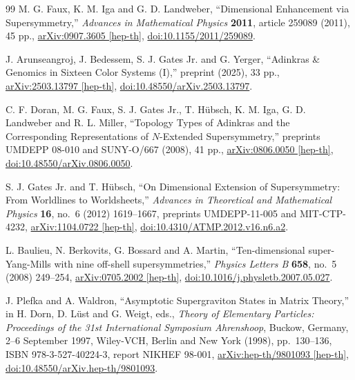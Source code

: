 \documentclass[11pt]{article}
\begin{document}
\begin{thebibliography}{99}
M. G. Faux, K. M. Iga and G. D. Landweber,
``Dimensional Enhancement via Supersymmetry,''
\emph{Advances in Mathematical Physics} \textbf{2011}, article 259089
(2011), 45 pp.,
\href{https://arxiv.org/abs/0907.3605}{arXiv:0907.3605 [hep-th]},
\href{https://doi.org/10.1155/2011/259089}{doi:10.1155/2011/259089}.

J. Arunseangroj, J. Bedessem, S. J. Gates Jr. and G. Yerger,
``Adinkras \& Genomics in Sixteen Color Systems (I),''
preprint (2025), 33 pp.,
\href{https://arxiv.org/abs/2503.13797}{arXiv:2503.13797 [hep-th]},
\href{https://doi.org/10.48550/arXiv.2503.13797}{doi:10.48550/arXiv.2503.13797}.

C. F. Doran, M. G. Faux, S. J. Gates Jr., T. H\"ubsch, K. M. Iga,
G. D. Landweber and R. L. Miller,
``Topology Types of Adinkras and the Corresponding Representations of
$N$-Extended Supersymmetry,''
preprints UMDEPP 08-010 and SUNY-O/667 (2008), 41 pp.,
\href{https://arxiv.org/abs/0806.0050}{arXiv:0806.0050 [hep-th]},
\href{https://doi.org/10.48550/arXiv.0806.0050}{doi:10.48550/arXiv.0806.0050}.

S. J. Gates Jr. and T. H\"ubsch,
``On Dimensional Extension of Supersymmetry: From Worldlines to Worldsheets,''
\emph{Advances in Theoretical and Mathematical Physics} \textbf{16}, no.~6
(2012) 1619--1667, preprints UMDEPP-11-005 and MIT-CTP-4232,
\href{https://arxiv.org/abs/1104.0722}{arXiv:1104.0722 [hep-th]},
\href{https://doi.org/10.4310/ATMP.2012.v16.n6.a2}{doi:10.4310/ATMP.2012.v16.n6.a2}.

L. Baulieu, N. Berkovits, G. Bossard and A. Martin,
``Ten-dimensional super-Yang-Mills with nine off-shell supersymmetries,''
\emph{Physics Letters B} \textbf{658}, no.~5 (2008) 249--254,
\href{https://arxiv.org/abs/0705.2002}{arXiv:0705.2002 [hep-th]},
\href{https://doi.org/10.1016/j.physletb.2007.05.027}{doi:10.1016/j.physletb.2007.05.027}.

J. Plefka and A. Waldron,
``Asymptotic Supergraviton States in Matrix Theory,''
in H. Dorn, D. L\"ust and G. Weigt, eds., \emph{Theory of Elementary Particles:
Proceedings of the 31st International Symposium Ahrenshoop}, Buckow, Germany,
2--6 September 1997, Wiley-VCH, Berlin and New York (1998), pp.~130--136,
ISBN 978-3-527-40224-3, report NIKHEF 98-001,
\href{https://arxiv.org/abs/hep-th/9801093}{arXiv:hep-th/9801093 [hep-th]},
\href{https://doi.org/10.48550/arXiv.hep-th/9801093}{doi:10.48550/arXiv.hep-th/9801093}.

\end{thebibliography}
\end{document}

